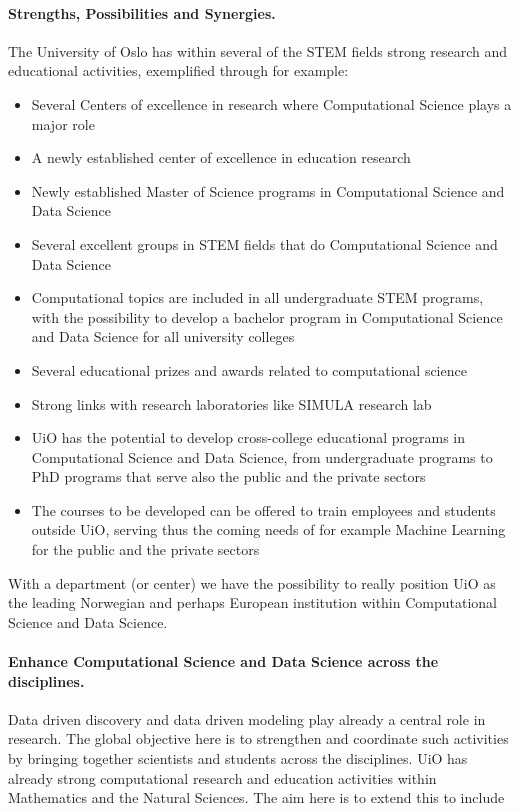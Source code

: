 \documentclass[oneside,final,10pt]{article}
\begin{document}
\paragraph{Strengths, Possibilities and Synergies.}
The University of Oslo has within several of the STEM fields strong research and educational activities, exemplified through for example:
\begin{itemize}
\item Several Centers of excellence in research where Computational Science plays a major role

\item A newly established center of excellence in education research

\item Newly established Master of Science programs in Computational Science and Data Science

\item Several excellent groups in STEM fields that do Computational Science and Data Science

\item Computational topics are included in all undergraduate STEM programs, with the possibility to develop a bachelor program in Computational Science and Data Science for all university colleges

\item Several educational prizes and awards related to computational science 

\item Strong links with research laboratories like SIMULA research lab

\item UiO has the potential to develop cross-college educational programs in Computational Science and Data Science, from undergraduate programs to PhD programs that serve also the public and the private sectors

\item The courses to be developed can be offered to train employees and students outside UiO, serving thus the coming needs of for example Machine Learning for the public and the private sectors
\end{itemize}

\noindent
With a department (or center) we have the possibility to really position UiO as the leading Norwegian and perhaps European institution within Computational Science and Data Science.



\paragraph{Enhance Computational Science and Data Science across the disciplines.}
Data driven discovery and data driven modeling play already a central role in research. The global objective here is to strengthen and coordinate such activities by bringing together scientists and students across the disciplines.
UiO has already strong computational research and education activities within Mathematics and the Natural Sciences.
The aim here is to extend this to include
\end{document}
